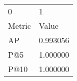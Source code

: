 \begin{tabular}{ll}
0 & 1 \\
Metric & Value \\
AP & 0.993056 \\
P@5 & 1.000000 \\
P@10 & 1.000000 \\
\end{tabular}
